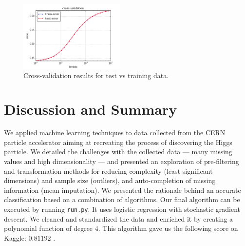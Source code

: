 \documentclass[fleqn,9 pt]{SelfArx} %
\begin{document}
\begin{sloppypar}
\begin{figure}
\centering
\includegraphics[width=0.47\textwidth]{images/cross_validation.png}
\caption{\small Cross-validation results for test vs training data.}
\label{fig:cross-validation}
\end{figure}

\section{Discussion and Summary}
\label{sec-results}
We applied machine learning techniques to data collected from the CERN particle accelerator aiming at recreating the process of discovering the Higgs particle. We detailed the challenges with the collected data --- many missing values and high dimensionality --- and presented an exploration of pre-filtering and transformation methods for reducing complexity (least significant dimensions) and sample size (outliers), and auto-completion of missing information (mean imputation). We presented the rationale behind an accurate classification based on a combination of algorithms. Our final algorithm can be executed by running \texttt{run.py}. It uses logistic regression with stochastic gradient descent. We cleaned and standardized the data and enriched it by creating a polynomial function of degree 4. This algorithm gave us the following score on Kaggle: $0.81192$ .




\end{sloppypar}
\end{document}
